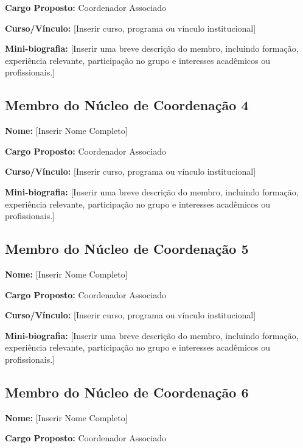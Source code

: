 \documentclass[11pt,a4paper]{article}
\begin{document}
\textbf{Cargo Proposto:} Coordenador Associado

\textbf{Curso/Vínculo:} [Inserir curso, programa ou vínculo institucional]

\textbf{Mini-biografia:}  
[Inserir uma breve descrição do membro, incluindo formação, experiência relevante, participação no grupo e interesses acadêmicos ou profissionais.]

\vspace{1em}

\subsection{Membro do Núcleo de Coordenação 4}

\textbf{Nome:} [Inserir Nome Completo]

\textbf{Cargo Proposto:} Coordenador Associado

\textbf{Curso/Vínculo:} [Inserir curso, programa ou vínculo institucional]

\textbf{Mini-biografia:}  
[Inserir uma breve descrição do membro, incluindo formação, experiência relevante, participação no grupo e interesses acadêmicos ou profissionais.]

\vspace{1em}

\subsection{Membro do Núcleo de Coordenação 5}

\textbf{Nome:} [Inserir Nome Completo]

\textbf{Cargo Proposto:} Coordenador Associado

\textbf{Curso/Vínculo:} [Inserir curso, programa ou vínculo institucional]

\textbf{Mini-biografia:}  
[Inserir uma breve descrição do membro, incluindo formação, experiência relevante, participação no grupo e interesses acadêmicos ou profissionais.]

\vspace{1em}

\subsection{Membro do Núcleo de Coordenação 6}

\textbf{Nome:} [Inserir Nome Completo]

\textbf{Cargo Proposto:} Coordenador Associado
\end{document}

